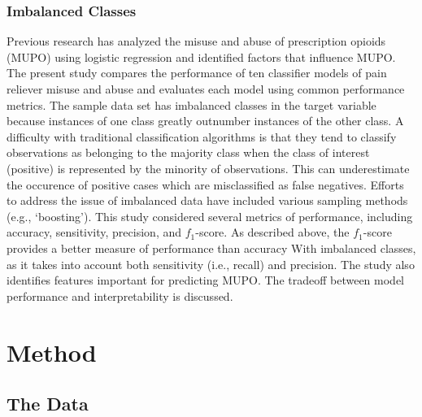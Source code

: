 \documentclass[sigconf]{acmart}
\begin{document}
\subsubsection{Imbalanced Classes}

Previous research has analyzed the misuse and abuse of prescription opioids
(MUPO) using logistic regression\cite{rice12, unick13, jones15, mccabe12} 
and identified factors that influence MUPO. The present study compares the
performance of ten classifier models of pain reliever misuse and abuse and 
evaluates each model using common performance metrics. The sample data set
has imbalanced classes in the target variable because instances of one class 
greatly outnumber instances of the other class. A difficulty with traditional 
classification algorithms is that they tend to classify observations as 
belonging to the majority class when the class of interest (positive)
is represented by the minority of observations. This can underestimate the
occurence of positive cases which are misclassified as false negatives. 
Efforts to address the issue of imbalanced data have included various sampling 
methods (e.g., `boosting'). This study considered several metrics of 
performance, including accuracy, sensitivity, precision, and $f_1$-score.
As described above, the $f_1$-score provides a better measure of performance
than accuracy With imbalanced classes, as it takes into account both 
sensitivity (i.e., recall) and precision. The study also identifies features
important for predicting MUPO. The tradeoff between model performance and 
interpretability is discussed. 


\section{Method}

\subsection{The Data}
\end{document}
